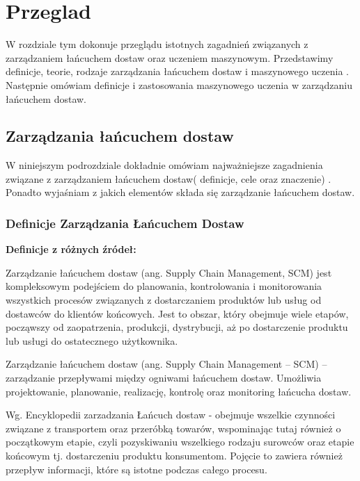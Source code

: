 \newpage %
\section{Przeglad }
W rozdziale tym dokonuje przeglądu istotnych zagadnień związanych z zarządzaniem łańcuchem dostaw oraz uczeniem maszynowym. Przedstawimy definicje, teorie, rodzaje  zarządzania łańcuchem dostaw  i maszynowego uczenia . Następnie omówiam definicje i zastosowania maszynowego uczenia w zarządzaniu łańcuchem dostaw.


\subsection{Zarządzania łańcuchem dostaw}
W niniejszym podrozdziale dokładnie omówiam najważniejsze zagadnienia związane z zarządzaniem łańcuchem dostaw( definicje, cele oraz znaczenie) . Ponadto wyjaśniam z jakich elementów składa się zarządzanie łańcuchem dostaw.

\vspace{\baselineskip}
\subsubsection{Definicje Zarządzania Łańcuchem Dostaw} 
\vspace{\baselineskip}
\textbf{Definicje z różnych źródeł:}

Zarządzanie łańcuchem dostaw (ang. Supply Chain Management, SCM) jest kompleksowym podejściem do planowania, kontrolowania i monitorowania wszystkich procesów związanych z dostarczaniem produktów lub usług od dostawców do klientów końcowych. Jest to obszar, który obejmuje wiele etapów, począwszy od zaopatrzenia, produkcji, dystrybucji, aż po dostarczenie produktu lub usługi do ostatecznego użytkownika.

Zarządzanie łańcuchem dostaw (ang. Supply Chain Management – SCM) – zarządzanie przepływami między ogniwami łańcuchem dostaw. Umożliwia projektowanie, planowanie, realizację, kontrolę oraz monitoring łańcucha dostaw. \cite{wik2023}



Wg. Encyklopedii zarzadzania Łańcuch dostaw - obejmuje wszelkie czynności związane z transportem oraz przeróbką towarów, wspominając tutaj również o początkowym etapie, czyli pozyskiwaniu wszelkiego rodzaju surowców oraz etapie końcowym tj. dostarczeniu produktu konsumentom. Pojęcie to zawiera również przepływ informacji, które są istotne podczas całego procesu. \cite{zarz2023}

